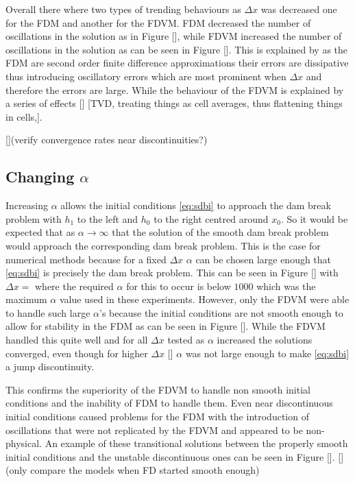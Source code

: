 \documentclass[SingleSpace,12pt,Proceedings]{Serre_ASCE}
\begin{document}
Overall there where two types of trending behaviours as $\Delta x$ was decreased one for the FDM and another for the FDVM. FDM decreased the number of oscillations in the solution as in Figure [], while FDVM increased the number of oscillations in the solution as can be seen in Figure []. This is explained by  as the FDM are second order finite difference approximations their errors are dissipative thus introducing oscillatory errors which are most prominent when $\Delta x$ and therefore the errors are large. While the behaviour of the FDVM is explained by a series of effects [] [TVD, treating things as cell averages, thus flattening things in cells,]. 

 

[](verify convergence rates near discontinuities?) 

\subsection{Changing $\alpha$}
Increasing $\alpha$ allows the initial conditions \eqref{eq:sdbi} to approach the dam break problem with $h_1$ to the left and $h_0$ to the right centred around $x_0$. So it would be expected that as $\alpha \rightarrow \infty$ that the solution of the smooth dam break problem would approach the corresponding dam break problem. This is the case for numerical methods because for a fixed $\Delta x$ $\alpha$ can be chosen large enough that \eqref{eq:sdbi} is precisely the dam break problem. This can be seen in Figure [] with $\Delta x =$ where the required $\alpha$ for this to occur is below $1000$ which was the maximum $\alpha$ value used in these experiments. However, only the FDVM were able to handle such large $\alpha$'s because the initial conditions are not smooth enough to allow for stability in the FDM as can be seen in Figure []. While the FDVM handled this quite well and for all $\Delta x$ tested as $\alpha$ increased the solutions converged, even though for higher $\Delta x$ [] $\alpha$ was not large enough to make \eqref{eq:sdbi} a jump discontinuity. 

This confirms the superiority of the FDVM to handle non smooth initial conditions and the inability of FDM to handle them. Even near discontinuous initial conditions caused problems for the FDM with the introduction of oscillations that were not replicated by the FDVM and appeared to be non-physical. An example of these transitional solutions between the properly smooth initial conditions and the unstable discontinuous ones can be seen in Figure []. [](only compare the models when FD started smooth enough)
\end{document}
